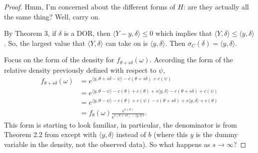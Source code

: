 \documentclass{amsbook}
\newcommand{\inner}[1]{\langle #1 \rangle}
\theoremstyle{definition}
\theoremstyle{remark}
\begin{document}
\begin{proof}
Hmm, I'm concerned about the different forms of $H$: are they actually all the same 
thing?  Well, carry on.

By Theorem 3, if $\delta$ is a DOR, then $\inner{Y-y, \delta} \leq 0$ which implies 
that $\inner{Y, \delta} \leq \inner{y, \delta}$.  So, the largest value that $\inner
{Y, \delta}$ can take on is $\inner{y, \delta}$.  Then $\sigma_C(\delta) = \inner{y, 
\delta}$.

Focus on the form of the density for $f_{\theta+s\delta}(\omega)$.  According the 
form of the relative density previously defined with respect to $\psi$,
\begin{align*}
 f_{\theta+s\delta}(\omega) &= e^{ \inner{y,\theta+s\delta - \psi} - c(\theta+s
\delta) + c(\psi)  } \\
 	&= e^{ \inner{y,\theta - \psi} -c(\theta) + c(\theta) + s \inner{y,\delta} - c
(\theta+s\delta) + c(\psi)  } \\
 	&= e^{ \inner{y,\theta - \psi} -c(\theta) + c(\psi) - c(\theta+s\delta) + s 
\inner{y,\delta} + c(\theta)   } \\
 	&= f_\theta(\omega) \frac{e^{c(\theta)}}{e^{ c(\theta+s\delta) - \inner{y,\delta}
s } }.
\end{align*}
This form is starting to look familiar, in particular, the denominator is from 
Theorem 2.2 from \citet{Geyer:1990} except with $\inner{y,\delta}$ instead of $b$ (where this 
$y$ is the dummy variable in the density, not the observed data).  So what happens as 
$s \to \infty$?  


\end{proof}
\end{document}
